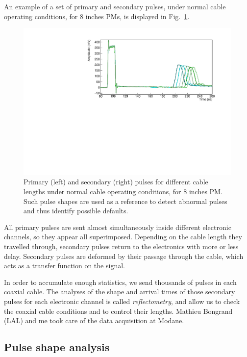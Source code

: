 An example of a set of primary and secondary pulses, under normal cable operating conditions, for $8$ inches PMs, is displayed in Fig.~\ref{fig:total_waveform}.
\begin{figure}[h!]
  \centering
  \includegraphics[width=1\textwidth]{commissioning/fig_commissioning/pulses_example.pdf}
  \caption{Primary (left) and secondary (right) pulses for different cable lengths under normal cable operating conditions, for $8$ inches PM.
    Such pulse shapes are used as a reference to detect abnormal pulses and thus identify possible defaults.
    \label{fig:total_waveform}}
\end{figure}
All primary pulses are sent almost simultaneously inside different electronic channels, so they appear all superimposed.
Depending on the cable length they travelled through, secondary pulses return to the electronics with more or less delay.
Secondary pulses are deformed by their passage through the cable, which acts as a transfer function on the signal.

In order to accumulate enough statistics, we send thousands of pulses in each coaxial cable.
The analyses of the shape and arrival times of those secondary pulses for each electronic channel is called \emph{reflectometry}, and allow us to check the coaxial cable conditions and to control their lengths.
Mathieu Bongrand (LAL) and me took care of the data acquisition at Modane.



\subsection{Pulse shape analysis}
\label{subsec:pulse_shape}

